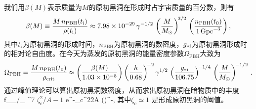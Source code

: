 我们用$\beta( M )$表示质量为$M$的原初黑洞在形成时占宇宙质量的百分数，则有\cite{Carr:2009jm}
\begin{equation}
    \beta( M )
    \equiv
    \frac{M\,n_{\mathrm{PBH}}(t_{\mathrm{i}})}{\rho(t_{\mathrm{i}})}
    \approx
    7.98 \times 10^{-29}\,
    \gamma^{-1/2}\,
    \left( \frac{M}{M_{\odot}} \right)^{\!3/2}\,
    \left( \frac{n_{\mathrm{PBH}}(t_{0})}{1\,\mathrm{Gpc}^{-3}} \right)
    ,
    \label{eq:beta}
\end{equation}
其中$t_{\mathrm{i}}$为原初黑洞的形成时间，$n_{\mathrm{PBH}}$为原初黑洞的数密度，$g_{* \mathrm{i}}$为原初黑洞形成时的相对论自由度。在今天为蒸发的原初黑洞的能量密度参数$\Omega_{\mathrm{PBH}}$大致为\cite{Carr:1975qj}
\begin{equation}
    \Omega_{\mathrm{PBH}}
    =
    \frac{M\,n_{\mathrm{PBH}}( t_{0} )}{\rho_{\mathrm{crit}}}
    \approx
    \left( \frac{\beta( M )}{1.03 \times 10^{-8}} \right)
    \left( \frac{h}{0.68} \right)^{\!-2}
    \gamma^{1/2}\,
    \left( \frac{g_{* \mathrm{i}}}{106.75} \right)^{\!-1/4}\,
    \left( \frac{M}{M_{\odot}} \right)^{\!-1/2}
    \,.
    \label{eq:omega}
\end{equation}
通过峰值理论可以算出原初黑洞数密度，从而求出原初黑洞在暗物质中的丰度\cite{Carr:2016drx}
\m\label{fpbh}
f_{}\equiv\Omega_{}/\Omega_{}  ^{7}
\({\zeta_c^2/A}-1\) e^{-{\zeta_c^2\over 2A}} \left(\right)^{-},
\n
其中$\zeta_{c}\simeq1$ \cite{Musco:2008hv,Musco:2004ak,Musco:2012au,Harada:2013epa,Escriva:2019nsa,Escriva:2019phb}是形成原初黑洞的阈值。

